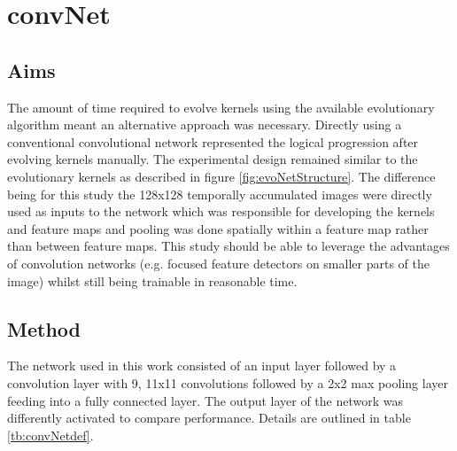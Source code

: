 \section{convNet}

\subsection{Aims}
The amount of time required to evolve kernels using the available evolutionary algorithm meant an alternative approach was necessary. 
Directly using a conventional convolutional network represented the logical progression after evolving kernels manually. 
The experimental design remained similar to the evolutionary kernels as described in figure \ref{fig:evoNetStructure}.
The difference being for this study the 128x128 temporally accumulated images were directly used as inputs to the network which was responsible for developing the kernels and feature maps and pooling was done spatially within a feature map rather than between feature maps.
This study should be able to leverage the advantages of convolution networks (e.g. focused feature detectors on smaller parts of the image) whilst still being trainable in reasonable time. 


\subsection{Method}
\label{sec:convMethod}
The network used in this work consisted of an input layer followed by a convolution layer with 9, 11x11 convolutions followed by a 2x2 max pooling layer feeding into a fully connected layer. 
The output layer of the network was differently activated to compare performance. 
Details are outlined in table \ref{tb:convNetdef}.

